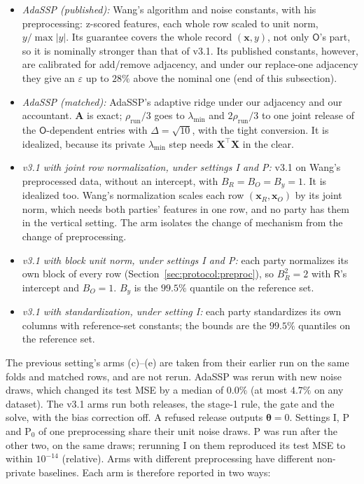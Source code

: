 \documentclass[11pt]{article}
\theoremstyle{definition}
\theoremstyle{plain}
\newcommand{\bX}{\mathbf{X}}
\newcommand{\bx}{\mathbf{x}}
\newcommand{\btheta}{\boldsymbol{\theta}}
\newcommand{\bA}{\mathbf{A}}
\newcommand{\Party}[1]{\textsf{#1}}
\newcommand{\Rp}{\Party{R}}
\newcommand{\Op}{\Party{O}}
\begin{document}
\begin{itemize}[noitemsep]
  \item[(a)] \emph{AdaSSP (published):} Wang's algorithm and noise constants, with his preprocessing: z-scored features, each whole row scaled to unit norm, $y/\max|y|$. Its guarantee covers the whole record $(\bx, y)$, not only $\Op$'s part, so it is nominally stronger than that of v3.1. Its published constants, however, are calibrated for add/remove adjacency, and under our replace-one adjacency they give an $\varepsilon$ up to $28\%$ above the nominal one (end of this subsection).
  \item[(b)] \emph{AdaSSP (matched):} AdaSSP's adaptive ridge under our adjacency and our accountant. $\bA$ is exact; $\rho_{\mathrm{run}}/3$ goes to $\lambda_{\min}$ and $2\rho_{\mathrm{run}}/3$ to one joint release of the $\Op$-dependent entries with $\Delta = \sqrt{10}$, with the tight conversion. It is idealized, because its private $\lambda_{\min}$ step needs $\bX^{\top}\bX$ in the clear.
  \item[(c)] \emph{v3.1 with joint row normalization, under settings I and P:} v3.1 on Wang's preprocessed data, without an intercept, with $B_R = B_O = B_y = 1$. It is idealized too. Wang's normalization scales each row $(\bx_R, \bx_O)$ by its joint norm, which needs both parties' features in one row, and no party has them in the vertical setting. The arm isolates the change of mechanism from the change of preprocessing.
  \item[(d)] \emph{v3.1 with block unit norm, under settings I and P:} each party normalizes its own block of every row (Section~\ref{sec:protocol:preproc}), so $B_R^2 = 2$ with $\Rp$'s intercept and $B_O = 1$. $B_y$ is the $99.5\%$ quantile on the reference set.
  \item[(e)] \emph{v3.1 with standardization, under setting I:} each party standardizes its own columns with reference-set constants; the bounds are the $99.5\%$ quantiles on the reference set.
\end{itemize}
The previous setting's arms (c)--(e) are taken from their earlier run on the same folds and matched rows, and are not rerun. AdaSSP was rerun with new noise draws, which changed its test MSE by a median of $0.0\%$ (at most $4.7\%$ on any dataset). The v3.1 arms run both releases, the stage-1 rule, the gate and the solve, with the bias correction off. A refused release outputs $\btheta = 0$. Settings I, P and P$_0$ of one preprocessing share their unit noise draws. P was run after the other two, on the same draws; rerunning I on them reproduced its test MSE to within $10^{-14}$ (relative). Arms with different preprocessing have different non-private baselines. Each arm is therefore reported in two ways:
\end{document}
